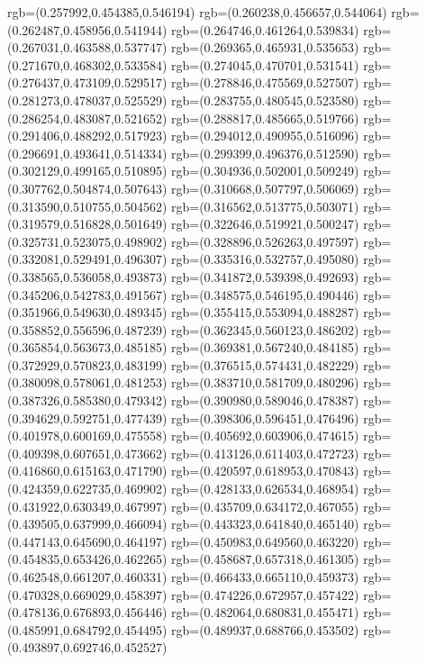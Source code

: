 {{{			rgb=(0.257992,0.454385,0.546194)
			rgb=(0.260238,0.456657,0.544064)
			rgb=(0.262487,0.458956,0.541944)
			rgb=(0.264746,0.461264,0.539834)
			rgb=(0.267031,0.463588,0.537747)
			rgb=(0.269365,0.465931,0.535653)
			rgb=(0.271670,0.468302,0.533584)
			rgb=(0.274045,0.470701,0.531541)
			rgb=(0.276437,0.473109,0.529517)
			rgb=(0.278846,0.475569,0.527507)
			rgb=(0.281273,0.478037,0.525529)
			rgb=(0.283755,0.480545,0.523580)
			rgb=(0.286254,0.483087,0.521652)
			rgb=(0.288817,0.485665,0.519766)
			rgb=(0.291406,0.488292,0.517923)
			rgb=(0.294012,0.490955,0.516096)
			rgb=(0.296691,0.493641,0.514334)
			rgb=(0.299399,0.496376,0.512590)
			rgb=(0.302129,0.499165,0.510895)
			rgb=(0.304936,0.502001,0.509249)
			rgb=(0.307762,0.504874,0.507643)
			rgb=(0.310668,0.507797,0.506069)
			rgb=(0.313590,0.510755,0.504562)
			rgb=(0.316562,0.513775,0.503071)
			rgb=(0.319579,0.516828,0.501649)
			rgb=(0.322646,0.519921,0.500247)
			rgb=(0.325731,0.523075,0.498902)
			rgb=(0.328896,0.526263,0.497597)
			rgb=(0.332081,0.529491,0.496307)
			rgb=(0.335316,0.532757,0.495080)
			rgb=(0.338565,0.536058,0.493873)
			rgb=(0.341872,0.539398,0.492693)
			rgb=(0.345206,0.542783,0.491567)
			rgb=(0.348575,0.546195,0.490446)
			rgb=(0.351966,0.549630,0.489345)
			rgb=(0.355415,0.553094,0.488287)
			rgb=(0.358852,0.556596,0.487239)
			rgb=(0.362345,0.560123,0.486202)
			rgb=(0.365854,0.563673,0.485185)
			rgb=(0.369381,0.567240,0.484185)
			rgb=(0.372929,0.570823,0.483199)
			rgb=(0.376515,0.574431,0.482229)
			rgb=(0.380098,0.578061,0.481253)
			rgb=(0.383710,0.581709,0.480296)
			rgb=(0.387326,0.585380,0.479342)
			rgb=(0.390980,0.589046,0.478387)
			rgb=(0.394629,0.592751,0.477439)
			rgb=(0.398306,0.596451,0.476496)
			rgb=(0.401978,0.600169,0.475558)
			rgb=(0.405692,0.603906,0.474615)
			rgb=(0.409398,0.607651,0.473662)
			rgb=(0.413126,0.611403,0.472723)
			rgb=(0.416860,0.615163,0.471790)
			rgb=(0.420597,0.618953,0.470843)
			rgb=(0.424359,0.622735,0.469902)
			rgb=(0.428133,0.626534,0.468954)
			rgb=(0.431922,0.630349,0.467997)
			rgb=(0.435709,0.634172,0.467055)
			rgb=(0.439505,0.637999,0.466094)
			rgb=(0.443323,0.641840,0.465140)
			rgb=(0.447143,0.645690,0.464197)
			rgb=(0.450983,0.649560,0.463220)
			rgb=(0.454835,0.653426,0.462265)
			rgb=(0.458687,0.657318,0.461305)
			rgb=(0.462548,0.661207,0.460331)
			rgb=(0.466433,0.665110,0.459373)
			rgb=(0.470328,0.669029,0.458397)
			rgb=(0.474226,0.672957,0.457422)
			rgb=(0.478136,0.676893,0.456446)
			rgb=(0.482064,0.680831,0.455471)
			rgb=(0.485991,0.684792,0.454495)
			rgb=(0.489937,0.688766,0.453502)
			rgb=(0.493897,0.692746,0.452527)
}}}
